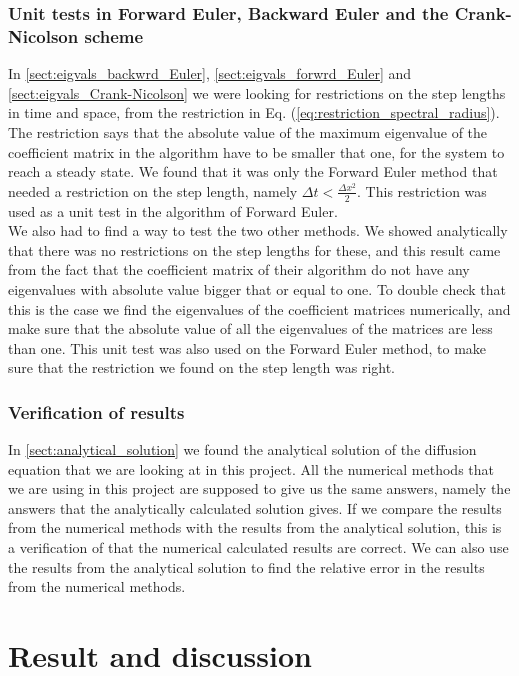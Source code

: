 \documentclass[12pt]{article}
\begin{document}
\begin{flushleft}
\subsubsection{Unit tests in Forward Euler, Backward Euler and the Crank-Nicolson scheme}
In \ref{sect:eigvals_backwrd_Euler}, \ref{sect:eigvals_forwrd_Euler} and \ref{sect:eigvals_Crank-Nicolson} we were looking for restrictions on the step lengths in time and space, from the restriction in Eq. (\ref{eq:restriction_spectral_radius}). The restriction says that the absolute value of the maximum eigenvalue of the coefficient matrix in the algorithm have to be smaller that one, for the system to reach a steady state. We found that it was only the Forward Euler method that needed a restriction on the step length, namely $\Delta t < \frac{\Delta x^2}{2}$. This restriction was used as a unit test in the algorithm of Forward Euler.\\
\vspace{5mm}
We also had to find a way to test the two other methods. We showed analytically that there was no restrictions on the step lengths for these, and this result came from the fact that the coefficient matrix of their algorithm do not have any eigenvalues with absolute value bigger that or equal to one. To double check that this is the case we find the eigenvalues of the coefficient matrices numerically, and make sure that the absolute value of all the eigenvalues of the matrices are less than one. This unit test was also used on the Forward Euler method, to make sure that the restriction we found on the step length was right. 

\subsubsection{Verification of results}
In \ref{sect:analytical_solution} we found the analytical solution of the diffusion equation that we are looking  at in this project. All the numerical methods that we are using in this project are supposed to give us the same answers, namely the answers that the analytically calculated solution gives. If we compare the results from the numerical methods with the results from the analytical solution, this is a verification of that the numerical calculated results are correct. We can also use the results from the analytical solution to find the relative error in the results from the numerical methods.


\section{Result and discussion}

\end{flushleft}
\end{document}
